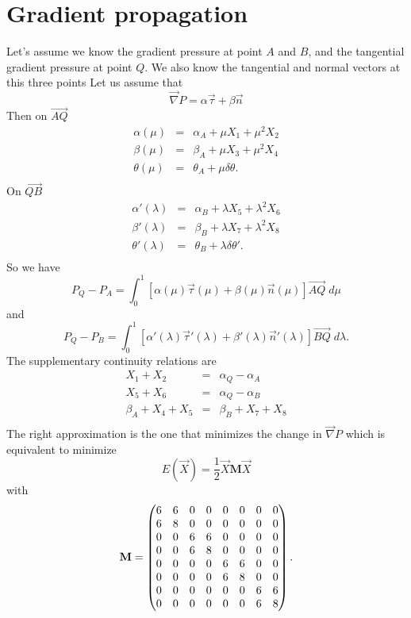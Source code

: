 \documentclass[11pt]{amsart}
\newcommand{\myvec}[1]{\overrightarrow{#1}}
\newcommand{\mygrad}{\vec{\nabla}}
\newcommand{\mymat}[1]{\mathbf{#1}}
\begin{document}
\section{Gradient propagation}
Let's assume we know the gradient pressure at point $A$ and $B$, and
the tangential gradient pressure at point $Q$.
We also know the tangential and normal vectors at this three points
Let us assume that
\[
	\mygrad P = \alpha \vec{\tau} + \beta \vec{n}
\]
Then on $\myvec{AQ}$
\[
	\begin{array}{rcl}
		\alpha(\mu) & = & \alpha_A + \mu X_1 + \mu^2 X_2\\
		\beta(\mu)  & = & \beta_A  + \mu X_3 + \mu^2 X_4 \\
		\theta(\mu) & = & \theta_A + \mu \delta \theta.\\
	\end{array}
\]
On $\myvec{QB}$
\[
	\begin{array}{rcl}
		\alpha'(\lambda) & = & \alpha_B + \lambda X_5 + \lambda^2 X_6\\
		\beta'(\lambda)  & = & \beta_B  + \lambda X_7 + \lambda^2 X_8 \\
		\theta'(\lambda) & = & \theta_B + \lambda \delta \theta'.\\
	\end{array}
\]
So we have
\[
	P_Q - P_A = \int_0^1 
	\left[ \alpha(\mu)\vec{\tau}(\mu) + \beta(\mu) \vec{n}(\mu)\right]\myvec{AQ} \; d\mu
\]
and
\[
	P_Q - P_B = \int_0^1 
	\left[ 
		\alpha'(\lambda)\vec{\tau}'(\lambda) + 
		\beta'(\lambda) \vec{n}'(\lambda)
	\right]
	\myvec{BQ} \; d\lambda.
\]
The supplementary continuity relations are
\[
	\begin{array}{rcl}
		X_1 + X_2 & = & \alpha_Q - \alpha_A\\
		X_5 + X_6 & = & \alpha_Q - \alpha_B\\
		\beta_A + X_4 + X_5 & = & \beta_B + X_7 + X_8\\
	\end{array}
\]
The right approximation is the one that minimizes the change in $\mygrad P$
which is equivalent to minimize
\[
	E(\vec{X}) = \dfrac{1}{2} \vec{X}\mymat{M}\vec{X}
\]
with
\[\mymat{M} =\begin{pmatrix}6 & 6 & 0 & 0 & 0 & 0 & 0 & 0\cr 6 & 8 & 0 & 0 & 0 & 0 & 0 & 0\cr 0 & 0 & 6 & 6 & 0 & 0 & 0 & 0\cr 0 & 0 & 6 & 8 & 0 & 0 & 0 & 0\cr 0 & 0 & 0 & 0 & 6 & 6 & 0 & 0\cr 0 & 0 & 0 & 0 & 6 & 8 & 0 & 0\cr 0 & 0 & 0 & 0 & 0 & 0 & 6 & 6\cr 0 & 0 & 0 & 0 & 0 & 0 & 6 & 8\end{pmatrix}.\]
\end{document}
